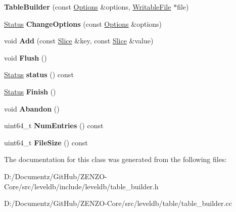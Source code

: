 \begin{DoxyCompactItemize}
\item 
\mbox{\label{classleveldb_1_1_table_builder_a7f5d99e06039848d9b342a4871b31cc6}} 
{\bfseries Table\+Builder} (const \mbox{\hyperlink{structleveldb_1_1_options}{Options}} \&options, \mbox{\hyperlink{classleveldb_1_1_writable_file}{Writable\+File}} $\ast$file)
\item 
\mbox{\label{classleveldb_1_1_table_builder_a6e37a5ddc82161e8665f2fba08031c24}} 
\mbox{\hyperlink{classleveldb_1_1_status}{Status}} {\bfseries Change\+Options} (const \mbox{\hyperlink{structleveldb_1_1_options}{Options}} \&options)
\item 
\mbox{\label{classleveldb_1_1_table_builder_a37bd347cb6340215475ac9b42dc19d10}} 
void {\bfseries Add} (const \mbox{\hyperlink{classleveldb_1_1_slice}{Slice}} \&key, const \mbox{\hyperlink{classleveldb_1_1_slice}{Slice}} \&value)
\item 
\mbox{\label{classleveldb_1_1_table_builder_a544560b4c97cd382ba9b8e0ef69dacfa}} 
void {\bfseries Flush} ()
\item 
\mbox{\label{classleveldb_1_1_table_builder_a9199d15b39f1b7ec83c49b58e8bd4768}} 
\mbox{\hyperlink{classleveldb_1_1_status}{Status}} {\bfseries status} () const
\item 
\mbox{\label{classleveldb_1_1_table_builder_a88f4bae006782e24462362d489dd3f35}} 
\mbox{\hyperlink{classleveldb_1_1_status}{Status}} {\bfseries Finish} ()
\item 
\mbox{\label{classleveldb_1_1_table_builder_a3b4dded079f960b8624bdfa13d967b94}} 
void {\bfseries Abandon} ()
\item 
\mbox{\label{classleveldb_1_1_table_builder_a1449306d91ce2edfd88625482ecd03d1}} 
uint64\+\_\+t {\bfseries Num\+Entries} () const
\item 
\mbox{\label{classleveldb_1_1_table_builder_a50ac83aca1c3321f16f26748d654a6ae}} 
uint64\+\_\+t {\bfseries File\+Size} () const
\end{DoxyCompactItemize}


The documentation for this class was generated from the following files\+:\begin{DoxyCompactItemize}
\item 
D\+:/\+Documentz/\+Git\+Hub/\+Z\+E\+N\+Z\+O-\/\+Core/src/leveldb/include/leveldb/table\+\_\+builder.\+h\item 
D\+:/\+Documentz/\+Git\+Hub/\+Z\+E\+N\+Z\+O-\/\+Core/src/leveldb/table/table\+\_\+builder.\+cc\end{DoxyCompactItemize}
